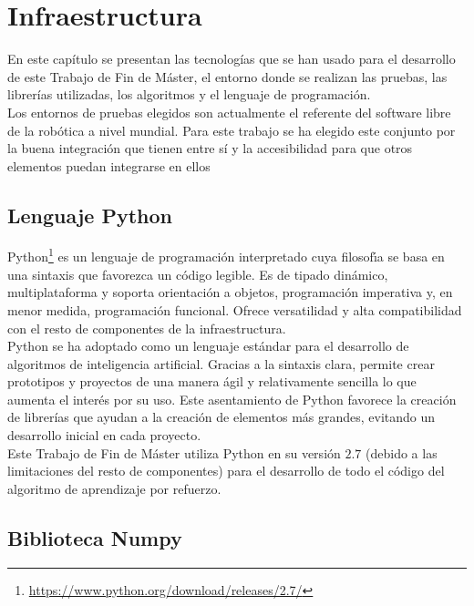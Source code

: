 \chapter{Infraestructura}\label{infraestructura}

En este capítulo se presentan las tecnologías que se han usado para el desarrollo de este Trabajo de Fin de Máster, el entorno donde se realizan las pruebas, las librerías utilizadas, los algoritmos y el lenguaje de programación.\\

Los entornos de pruebas elegidos son actualmente el referente del software libre de la robótica a nivel mundial. Para este trabajo se ha elegido este conjunto por la buena integración que tienen entre sí y la accesibilidad para que otros elementos puedan integrarse en ellos

\section{Lenguaje Python}
Python\footnote{\url{https://www.python.org/download/releases/2.7/}} es un lenguaje de programación interpretado cuya filosofı́a se basa en una sintaxis que favorezca un código legible. Es de tipado dinámico, multiplataforma y soporta orientación a objetos, programación imperativa y, en menor medida, programación funcional. Ofrece versatilidad y alta compatibilidad con el resto de componentes de la infraestructura.\\

Python se ha adoptado como un lenguaje estándar para el desarrollo de algoritmos de inteligencia artificial. Gracias a la sintaxis clara, permite crear prototipos y proyectos de una manera ágil y relativamente sencilla lo que aumenta el interés por su uso. Este asentamiento de Python favorece la creación de librerías que ayudan a la creación de elementos más grandes, evitando un desarrollo inicial en cada proyecto.\\

Este Trabajo de Fin de Máster utiliza Python en su versión $2.7$ (debido a las limitaciones del resto de componentes) para el desarrollo de todo el código del algoritmo de aprendizaje por refuerzo.

\section{Biblioteca Numpy}\label{numpy}

